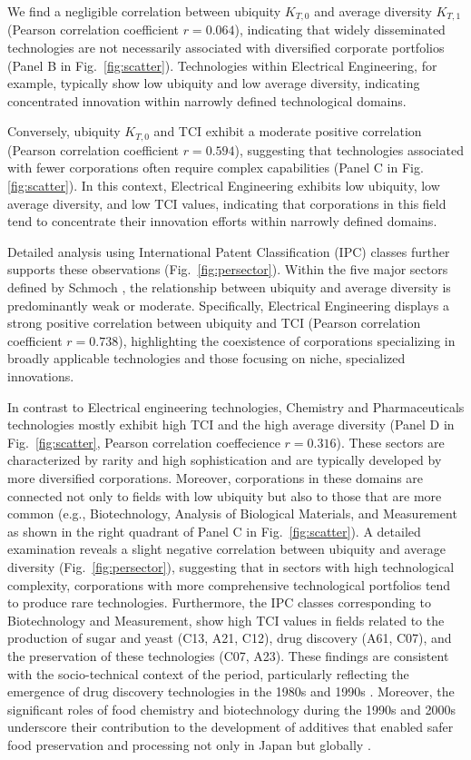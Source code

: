We find a negligible correlation between ubiquity $K_{T,0}$ and average diversity $K_{T,1}$ (Pearson correlation coefficient $r=0.064$), indicating that widely disseminated technologies are not necessarily associated with diversified corporate portfolios (Panel B in Fig.~\ref{fig:scatter}). Technologies within Electrical Engineering, for example, typically show low ubiquity and low average diversity, indicating concentrated innovation within narrowly defined technological domains.

Conversely, ubiquity $K_{T,0}$ and TCI exhibit a moderate positive correlation (Pearson correlation coefficient $r=0.594$), suggesting that technologies associated with fewer corporations often require complex capabilities (Panel C in Fig.\ref{fig:scatter}). 
In this context, Electrical Engineering exhibits low ubiquity, low average diversity, and low TCI values, indicating that corporations in this field tend to concentrate their innovation efforts within narrowly defined domains.

Detailed analysis using International Patent Classification (IPC) classes further supports these observations (Fig.~\ref{fig:persector}). 
Within the five major sectors defined by Schmoch \cite{Schmoch2008}, the relationship between ubiquity and average diversity is predominantly weak or moderate. Specifically, Electrical Engineering displays a strong positive correlation between ubiquity and TCI (Pearson correlation coefficient $r=0.738$), highlighting the coexistence of corporations specializing in broadly applicable technologies and those focusing on niche, specialized innovations.

In contrast to Electrical engineering technologies, Chemistry and Pharmaceuticals technologies mostly exhibit high TCI and the high average diversity (Panel D in Fig.~\ref{fig:scatter}, Pearson correlation coeffecience $r=0.316$).
These sectors are characterized by rarity and high sophistication and are typically developed by more diversified corporations. 
Moreover, corporations in these domains are connected not only to fields with low ubiquity but also to those that are more common (e.g., Biotechnology, Analysis of Biological Materials, and Measurement as shown in the right quadrant of Panel C in Fig.~\ref{fig:scatter}). 
A detailed examination reveals a slight negative correlation between ubiquity and average diversity (Fig.~\ref{fig:persector}), suggesting that in sectors with high technological complexity, corporations with more comprehensive technological portfolios tend to produce rare technologies. 
Furthermore, the IPC classes corresponding to Biotechnology and Measurement, show high TCI values in fields related to the production of sugar and yeast (C13, A21, C12), drug discovery (A61, C07), and the preservation of these technologies (C07, A23). These findings are consistent with the socio-technical context of the period, particularly reflecting the emergence of drug discovery technologies in the 1980s and 1990s \cite{Sakakibara2014,Nakamura2022}. Moreover, the significant roles of food chemistry and biotechnology during the 1990s and 2000s underscore their contribution to the development of additives that enabled safer food preservation and processing not only in Japan but globally \cite{Bhatia2018,Murakami2024}.
